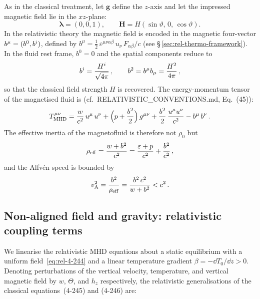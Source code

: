 As in the classical treatment, let $\mathbf{g}$ define the $z$-axis and
let the impressed magnetic field lie in the $xz$-plane:
\begin{equation}
  \boldsymbol{\lambda} = (0,0,1), \qquad
  \mathbf{H} = H(\sin\vartheta,\, 0,\, \cos\vartheta).
  \label{eq:rel-4-244}
\end{equation}
In the relativistic theory the magnetic field is encoded in the
magnetic four-vector $b^{\mu} = (b^{0}, b^{i})$, defined by
$b^{\mu} = \tfrac{1}{2}\,\varepsilon^{\mu\nu\alpha\beta}\,
u_{\nu}\,F_{\alpha\beta}/c$ (see \S\,\ref{sec:rel-thermo-framework}).
In the fluid rest frame, $b^{0}=0$ and the spatial components reduce to
\begin{equation}
  b^{i} = \frac{H^{i}}{\sqrt{4\pi}}\,, \qquad
  b^2 = b^{\mu}b_{\mu}
       = \frac{H^{2}}{4\pi}\,,
  \label{eq:rel-bmu-rest}
\end{equation}
so that the classical field strength $H$ is recovered.  The energy-momentum
tensor of the magnetised fluid is (cf.\ RELATIVISTIC\_CONVENTIONS.md,
Eq.~(45)):
\begin{equation}
  T^{\mu\nu}_{\mathrm{MHD}}
  = \frac{w}{c^{2}}\,u^{\mu}\,u^{\nu}
    + \Bigl(p + \frac{b^2}{2}\Bigr)\,g^{\mu\nu}
    + \frac{b^2}{2}\,\frac{u^{\mu}u^{\nu}}{c^{2}}
    - b^{\mu}\,b^{\nu}\,.
  \label{eq:rel-MHD-Tmunu}
\end{equation}
The effective inertia of the magnetofluid is therefore not $\rho_{0}$ but
\begin{equation}
  \rho_{\mathrm{eff}}
  = \frac{w + b^2}{c^{2}}
  = \frac{\varepsilon + p}{c^{2}} + \frac{b^2}{c^{2}}\,,
  \label{eq:rel-rhoeff}
\end{equation}
and the Alfv\'en speed is bounded by
\begin{equation}
  v_{\mathrm{A}}^{2}
  = \frac{b^2}{\rho_{\mathrm{eff}}}
  = \frac{b^2\,c^{2}}{w + b^2}
  < c^{2}\,.
  \label{eq:rel-vA-def}
\end{equation}

\subsection{Non-aligned field and gravity: relativistic coupling terms}
\label{subsec:rel-47-coupling}

We linearise the relativistic MHD equations about a static equilibrium
with a uniform field~\eqref{eq:rel-4-244} and a linear temperature
gradient $\beta = -\dd T_{0}/\dd z > 0$.  Denoting perturbations of the
vertical velocity, temperature, and vertical magnetic field by $w$,
$\Theta$, and $h_{z}$ respectively, the relativistic generalisations of
the classical equations~(4-245) and (4-246) are:

